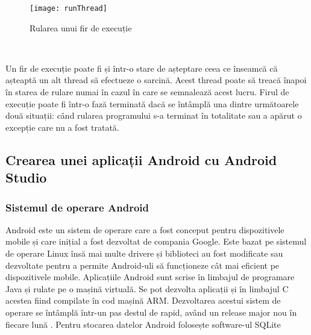 \documentclass[../IoMusT.tex]{subfiles}
\begin{document}
\begin{figure}[h]
\centering
\texttt{[image: runThread]}
\caption{Rularea unui fir de execuție}
\label{fig:runthread}
\end{figure}
\\
\par Un fir de execuție poate fi și într-o stare de așteptare ceea ce înseamcă că așteaptă un alt thread să efectueze o sarcină. Acest thread poate să treacă înapoi în starea de rulare numai în cazul în care se semnalează acest lucru. Firul de execuție poate fi într-o fază terminată dacă se întâmplă una dintre următoarele două situații: când rularea programului s-a terminat  în totalitate sau a apărut o excepție care nu a fost tratată.

\subsection{Crearea unei aplicații Android cu Android Studio}
\subsubsection{Sistemul de operare Android}
Android este un sistem de operare care a fost conceput pentru dispozitivele mobile și care inițial a fost dezvoltat de compania Google. Este bazat pe sistemul de operare Linux însă mai multe drivere și biblioteci  au fost mo\-di\-fi\-ca\-te sau dezvoltate pentru a permite Android-uli să funcționeze cât mai eficient pe dispozitivele mobile. Aplicațiile Android sunt scrise în limbajul de programare Java și rulate pe o mașină virtuală. Se pot dezvolta aplicații și în limbajul C acestea fiind compilate în cod mașină ARM. Dezvoltarea acestui sistem de operare se întâmplă într-un pas destul de rapid, având un release major nou în fiecare lună  \cite{Android}. Pentru stocarea datelor Android folosește software-ul SQLite
\end{document}
